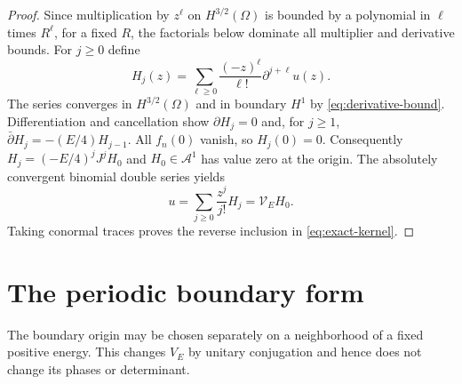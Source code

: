 \documentclass[11pt]{amsart}
\numberwithin{equation}{section}
\newcommand{\VV}{\mathcal V}
\begin{document}
\begin{proof}
Since multiplication by $z^\ell$ on $H^{3/2}(\Omega)$ is bounded
by a polynomial in $\ell$ times $R^\ell$, for a fixed $R$, the
factorials below dominate all multiplier and derivative bounds.
For $j\ge0$ define
\[
 H_j(z)=\sum_{\ell\ge0}\frac{(-z)^\ell}{\ell!}\partial^{j+\ell}u(z).
\]
The series converges in $H^{3/2}(\Omega)$ and in boundary $H^1$ by
\eqref{eq:derivative-bound}. Differentiation and cancellation show
$\partial H_j=0$ and, for $j\ge1$,
$\bar\partial H_j=-(E/4)H_{j-1}$. All $f_n(0)$ vanish, so
$H_j(0)=0$. Consequently $H_j=(-E/4)^jJ^jH_0$ and
$H_0\in\mathscr A^1$ has value zero at the origin. The absolutely
convergent binomial double series yields
\[
 u=\sum_{j\ge0}\frac{z^j}{j!}H_j=\VV_EH_0.
\]
Taking conormal traces proves the reverse inclusion in
\eqref{eq:exact-kernel}.
\end{proof}

\section{The periodic boundary form}\label{sec:periodic}

The boundary origin may be chosen separately on a neighborhood of a
fixed positive energy. This changes $V_E$ by unitary conjugation and
hence does not change its phases or determinant.
\end{document}
